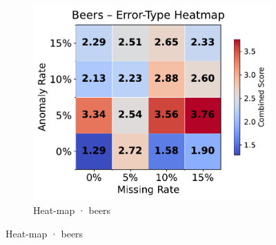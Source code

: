 \documentclass[10pt]{article} %
\numberwithin{equation}{section}
\begin{document}
\begin{figure}[htbp]
\begin{subfigure}{0.35\linewidth}
  \end{subfigure}\hfill
  \begin{subfigure}{0.295\linewidth}
    \centering
    \includegraphics[width=\linewidth]{figures/5.3.2graph/beers_heatmap.pdf}
    \caption{Heat-map · beers}
  \end{subfigure}


\end{figure}
\end{document}
